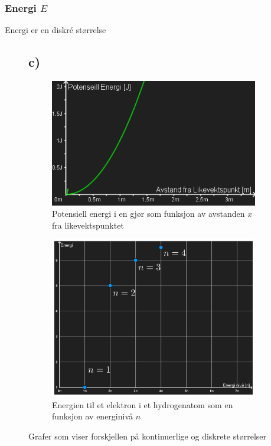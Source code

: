 \documentclass{article}
\begin{document}
\subsubsection*{\textbf{Energi $E$}}
Energi er en diskré størrelse 
  

\begin{figure}
\subsection*{c)}
    \centering
    \begin{subfigure}{.45\textwidth}
      \centering
      \includegraphics[width = \textwidth]{Figures/A.1.c.i.png}
      \caption{Potensiell energi i en gjør som funksjon av avstanden $x$ fra likevektspunktet}
      \label{subfig: A.1.c.i}
    \end{subfigure}
    \hfill
    \begin{subfigure}{.45\textwidth}
      \centering
      \includegraphics[width = \textwidth]{Figures/A.1.c.ii.pdf}
      \caption{Energien til et elektron i et hydrogenatom som en funksjon av energinivå $n$}
      \label{subfig: A.1.c.ii}
    \end{subfigure}
    \hfill
    \caption{Grafer som viser forskjellen på kontinuerlige og diskrete størrelser}
    \label{fig: A.1.c}
\end{figure}
\end{document}

